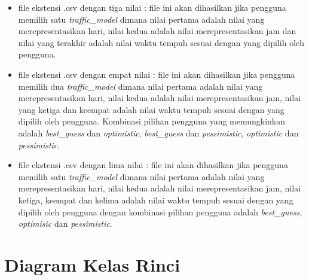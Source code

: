 \begin{itemize}
	\item file ekstensi .csv dengan tiga nilai : file ini akan dihasilkan jika pengguna memilih satu \textit{traffic\_model} dimana nilai pertama adalah nilai yang merepresentasikan hari, nilai kedua adalah nilai merepresentasikan jam dan nilai yang terakhir adalah nilai waktu tempuh sesuai dengan yang dipilih oleh pengguna.
	\item file ekstensi .csv dengan empat nilai : file ini akan dihasilkan jika pengguna memilih dua \textit{traffic\_model} dimana nilai pertama adalah nilai yang merepresentasikan hari, nilai kedua adalah nilai merepresentasikan jam, nilai yang ketiga dan keempat adalah nilai waktu tempuh sesuai dengan yang dipilih oleh pengguna. Kombinasi pilihan pengguna yang memungkinkan adalah \textit{best\_guess} dan \textit{optimistic}, \textit{best\_guess} dan \textit{pessimistic}, \textit{optimistic} dan \textit{pessimistic}. 
	\item file ekstensi .csv dengan lima nilai : file ini akan dihasilkan jika pengguna memilih satu \textit{traffic\_model} dimana nilai pertama adalah nilai yang merepresentasikan hari, nilai kedua adalah nilai merepresentasikan jam, nilai ketiga, keempat dan kelima adalah nilai waktu tempuh sesuai dengan yang dipilih oleh pengguna dengan kombinasi pilihan pengguna adalah \textit{best\_guess}, \textit{optimisic} dan \textit{pessimistic}.
\end{itemize}

\section{Diagram Kelas Rinci}
\label{sec:diagramkelasrinci}

